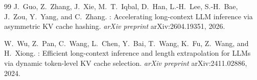 \documentclass[10pt,letterpaper]{article}
\begin{document}
\begin{thebibliography}{99}
J.~Guo, Z.~Zhang, J.~Xie, M.~T.~Iqbal, D.~Han, L.-H.~Lee, S.-H.~Bae, J.~Zou,
  Y.~Yang, and C.~Zhang.
: Accelerating long-context {LLM} inference via asymmetric
  {KV} cache hashing.
\newblock \emph{arXiv preprint} arXiv:2604.19351, 2026.

W.~Wu, Z.~Pan, C.~Wang, L.~Chen, Y.~Bai, T.~Wang, K.~Fu, Z.~Wang, and H.~Xiong.
: Efficient long-context inference and length extrapolation
  for {LLMs} via dynamic token-level {KV} cache selection.
\newblock \emph{arXiv preprint} arXiv:2411.02886, 2024.

\end{thebibliography}
\end{document}
